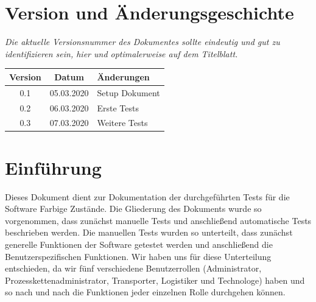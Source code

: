 \documentclass[enabledeprecatedfontcommands,fontsize=12pt,paper=a4,twoside]{scrartcl}
\begin{document}


\newpage

  \thispagestyle{fancy}
  \fancyhead{}
  \fancyfoot{}
  \renewcommand{\headrulewidth}{0.4pt}
  \tableofcontents

\newpage





\section*{Version und Änderungsgeschichte}

{\em Die aktuelle Versionsnummer des Dokumentes sollte eindeutig und gut zu
identifizieren sein, hier und optimalerweise auf dem Titelblatt.}

\begin{tabular}{ccl}
Version & Datum & Änderungen \\
\hline
0.1 & 05.03.2020 & Setup Dokument \\
0.2 & 06.03.2020 & Erste Tests \\
0.3 & 07.03.2020 & Weitere Tests\\
\end{tabular}



\newpage
\section{Einführung}

Dieses Dokument dient zur Dokumentation der durchgeführten Tests für die Software Farbige Zustände. Die Gliederung des Dokuments wurde so vorgenommen, dass zunächst manuelle Tests und anschließend automatische Tests beschrieben werden. Die manuellen Tests wurden so unterteilt, dass zunächst generelle Funktionen der Software getestet werden und anschließend die Benutzerspezifischen Funktionen. Wir haben uns für diese Unterteilung entschieden, da wir fünf verschiedene Benutzerrollen (Administrator, Prozesskettenadministrator, Transporter, Logistiker und Technologe) haben und so nach und nach die Funktionen jeder einzelnen Rolle durchgehen können. 
\end{document}
